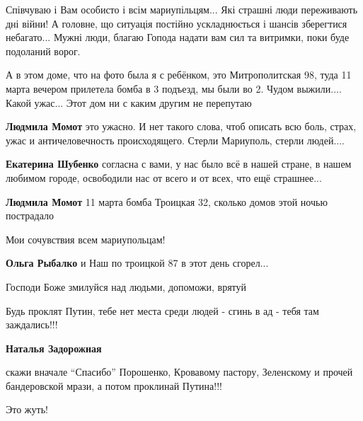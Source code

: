 
Співчуваю і Вам особисто і всім мариупільцям... Які страшні люди переживають дні
війни! А головне, що ситуація постійно ускладнюється і шансів зберегтися
небагато... Мужні люди, благаю Гопода надати вам сил та витримки, поки буде
подоланий ворог.🙏🙏🙏🇺🇦


А в этом доме, что на фото была я с ребёнком, это Митрополитская 98, туда 11
марта вечером прилетела бомба в 3 подъезд, мы были во 2. Чудом выжили.... Какой
ужас... Этот дом ни с каким другим не перепутаю

\begin{itemize} %
\textbf{Людмила Момот} это ужасно. И нет такого слова, чтоб описать всю боль, страх, ужас и античеловечность происходящего. Стерли Мариуполь, стерли людей....

\textbf{Екатерина Шубенко} согласна с вами, у нас было всё в нашей стране, в нашем любимом городе, освободили нас от всего и от всех, что ещё страшнее...

\textbf{Людмила Момот} 11 марта бомба Троицкая 32, сколько домов этой ночью пострадало 🙈


Мои сочувствия всем мариупольцам!🙏

\textbf{Ольга Рыбалко} и Наш по троицкой 87 в этот день сгорел...

\end{itemize} %


Господи Боже змилуйся над людьми, допоможи, врятуй


Будь проклят Путин, тебе нет места среди людей - сгинь в ад - тебя там
заждались!!!

\begin{itemize} %
\textbf{Наталья Задорожная} 

скажи вначале \enquote{Спасибо} Порошенко, Кровавому пастору, Зеленскому и прочей бандеровской мрази, а потом проклинай Путина!!!

\end{itemize} %


Это жуть!


